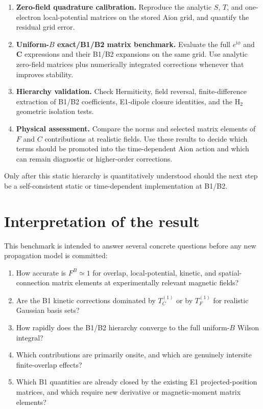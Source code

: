\documentclass[11pt]{article}
\newcommand{\ii}{\mathrm{i}}
\newcommand{\vect}[1]{\bm{#1}}
\begin{document}
\begin{enumerate}[leftmargin=*]
\item \textbf{Zero-field quadrature calibration.}  Reproduce the analytic $S$, $T$, and one-electron local-potential matrices on the stored Aion grid, and quantify the residual grid error.

\item \textbf{Uniform-$B$ exact/B1/B2 matrix benchmark.}  Evaluate the full $e^{\ii\phi}$ and $\vect C$ expressions and their B1/B2 expansions on the same grid.  Use analytic zero-field matrices plus numerically integrated corrections whenever that improves stability.

\item \textbf{Hierarchy validation.}  Check Hermiticity, field reversal, finite-difference extraction of B1/B2 coefficients, E1-dipole closure identities, and the H$_2$ geometric isolation tests.

\item \textbf{Physical assessment.}  Compare the norms and selected matrix elements of $F$ and $C$ contributions at realistic fields.  Use these results to decide which terms should be promoted into the time-dependent Aion action and which can remain diagnostic or higher-order corrections.
\end{enumerate}

Only after this static hierarchy is quantitatively understood should the next step be a self-consistent static or time-dependent implementation at B1/B2.

\section{Interpretation of the result}

This benchmark is intended to answer several concrete questions before any new propagation model is committed:
\begin{enumerate}[leftmargin=*]
\item How accurate is $F^B\simeq1$ for overlap, local-potential, kinetic, and spatial-connection matrix elements at experimentally relevant magnetic fields?
\item Are the B1 kinetic corrections dominated by $T_C^{(1)}$ or by $T_F^{(1)}$ for realistic Gaussian basis sets?
\item How rapidly does the B1/B2 hierarchy converge to the full uniform-$B$ Wilson integral?
\item Which contributions are primarily onsite, and which are genuinely intersite finite-overlap effects?
\item Which B1 quantities are already closed by the existing E1 projected-position matrices, and which require new derivative or magnetic-moment matrix elements?
\end{enumerate}
\end{document}
